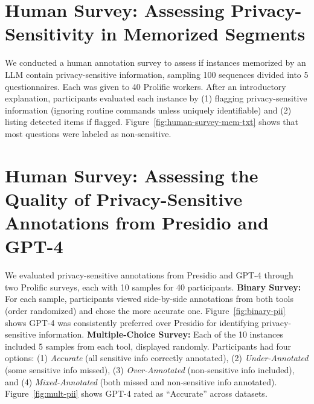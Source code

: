 \section{Human Survey: Assessing Privacy-Sensitivity in Memorized Segments}
\label{appendix:human-survey-priv-mem-txt}

We conducted a human annotation survey to assess if instances memorized by an LLM contain privacy-sensitive information, sampling 100 sequences divided into 5 questionnaires. Each was given to 40 Prolific workers. After an introductory explanation, participants evaluated each instance by (1) flagging privacy-sensitive information (ignoring routine commands unless uniquely identifiable) and (2) listing detected items if flagged. Figure~\ref{fig:human-survey-mem-txt} shows that most questions were labeled as non-sensitive.


\section{Human Survey: Assessing the Quality of Privacy-Sensitive Annotations from Presidio and GPT-4}
\label{appendix:human-survey-priv-annotatations}


We evaluated privacy-sensitive annotations from Presidio and GPT-4 through two Prolific surveys, each with 10 samples for 40 participants. \textbf{Binary Survey:} For each sample, participants viewed side-by-side annotations from both tools (order randomized) and chose the more accurate one. Figure~\ref{fig:binary-pii} shows GPT-4 was consistently preferred over Presidio for identifying privacy-sensitive information. \textbf{Multiple-Choice Survey:} Each of the 10 instances included 5 samples from each tool, displayed randomly. Participants had four options: (1) \emph{Accurate} (all sensitive info correctly annotated), (2) \emph{Under-Annotated} (some sensitive info missed), (3) \emph{Over-Annotated} (non-sensitive info included), and (4) \emph{Mixed-Annotated} (both missed and non-sensitive info annotated). Figure~\ref{fig:mult-pii} shows GPT-4 rated as ``Accurate'' across datasets.


